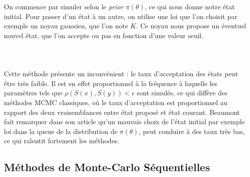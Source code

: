 \documentclass{article}
\theoremstyle{definition}
\begin{document}
On commence par simuler selon le \textit{prior} $\pi(\theta)$, ce qui nous donne notre état initial. Pour passer d'un état à un autre, on utilise une loi que l'on choisit par exemple un noyau gaussien, que l'on note $K$. Ce noyau nous propose un éventuel nouvel état, que l'on accepte ou pas en fonction d'une valeur seuil.\\ 
\\

\\
\\

Cette méthode présente un inconvénient : le taux d'acceptation des états peut être très faible. Il est en effet proportionnel à la fréquence à laquelle les paramètres tels que $\rho(S(x),S(y))<\epsilon$ sont simulés, ce qui diffère des méthodes MCMC classiques, où le taux d'acceptation est proportionnel au rapport des deux vraisemblances entre état proposé et état courant. Beaumont fait remarquer dans son article qu'un mauvais choix de l'état initial par exemple loi dans la queue de la distribution de $\pi(\theta)$, peut conduire à des taux très bas, ce qui ralentit fortement les méthodes.\\

\subsection{Méthodes de Monte-Carlo Séquentielles}
\end{document}
